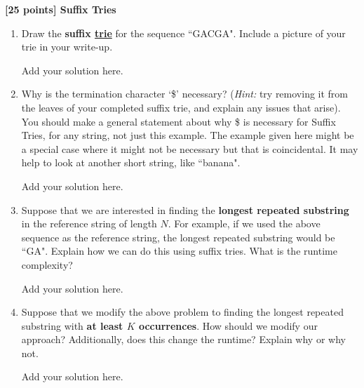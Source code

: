 {\bf [25 points] Suffix Tries}\\

\vspace{0.1in}

\begin{enumerate}
    \item Draw the \textbf{suffix \underline{trie}} for the sequence ``GACGA". Include a picture of your trie in your write-up.
    \begin{solution}
    Add your solution here.
    \end{solution}
    \item Why is the termination character `\$' necessary? (\textit{Hint:} try removing it from the leaves of your completed suffix trie, and explain any issues that arise). You should make a general statement about why \$ is necessary for Suffix Tries, for any string, not just this example. The example given here might be a special case where it might not be necessary but that is coincidental. It may help to look at another short string, like ``banana".
    \begin{solution}
    Add your solution here.
    \end{solution}
    \item Suppose that we are interested in finding the \textbf{longest repeated substring} in the reference string of length $N$. For example, if we used the above sequence as the reference string, the longest repeated substring would be ``GA". Explain how we can do this using suffix tries. What is the runtime complexity?
    \begin{solution}
    Add your solution here.
    \end{solution}
    \item Suppose that we modify the above problem to finding the longest repeated substring with \textbf{at least $K$ occurrences}. How should we modify our approach? Additionally, does this change the runtime? Explain why or why not.
    \begin{solution}
    Add your solution here.
    \end{solution}
\end{enumerate}


